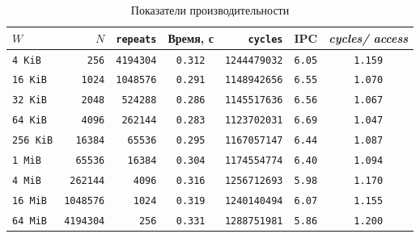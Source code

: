 \begin{table}[H]
\caption{Показатели производительности}
\label{tab:working-set}
\small
\begin{tabularx}{\textwidth}{|l|r|r|C|r|C|C|}
	\hline
	$W$ & $N$ & \texttt{repeats} & Время, с & \texttt{cycles} & IPC & \textit{cycles/ access} \\
	\hline
	\texttt{4 KiB} & \texttt{256} & \texttt{4194304} & \texttt{0.312} & \texttt{1244479032} & \texttt{6.05} & \texttt{1.159} \\
	\hline
	\texttt{16 KiB} & \texttt{1024} & \texttt{1048576} & \texttt{0.291} & \texttt{1148942656} & \texttt{6.55} & \texttt{1.070} \\
	\hline
	\texttt{32 KiB} & \texttt{2048} & \texttt{524288} & \texttt{0.286} & \texttt{1145517636} & \texttt{6.56} & \texttt{1.067} \\
	\hline
	\texttt{64 KiB} & \texttt{4096} & \texttt{262144} & \texttt{0.283} & \texttt{1123702031} & \texttt{6.69} & \texttt{1.047} \\
	\hline
	\texttt{256 KiB} & \texttt{16384} & \texttt{65536} & \texttt{0.295} & \texttt{1167057147} & \texttt{6.44} & \texttt{1.087} \\
	\hline
	\texttt{1 MiB} & \texttt{65536} & \texttt{16384} & \texttt{0.304} & \texttt{1174554774} & \texttt{6.40} & \texttt{1.094} \\
	\hline
	\texttt{4 MiB} & \texttt{262144} & \texttt{4096} & \texttt{0.316} & \texttt{1256712693} & \texttt{5.98} & \texttt{1.170} \\
	\hline
	\texttt{16 MiB} & \texttt{1048576} & \texttt{1024} & \texttt{0.319} & \texttt{1240140494} & \texttt{6.07} & \texttt{1.155} \\
	\hline
	\texttt{64 MiB} & \texttt{4194304} & \texttt{256} & \texttt{0.331} & \texttt{1288751981} & \texttt{5.86} & \texttt{1.200} \\
	\hline
\end{tabularx}
\end{table}

